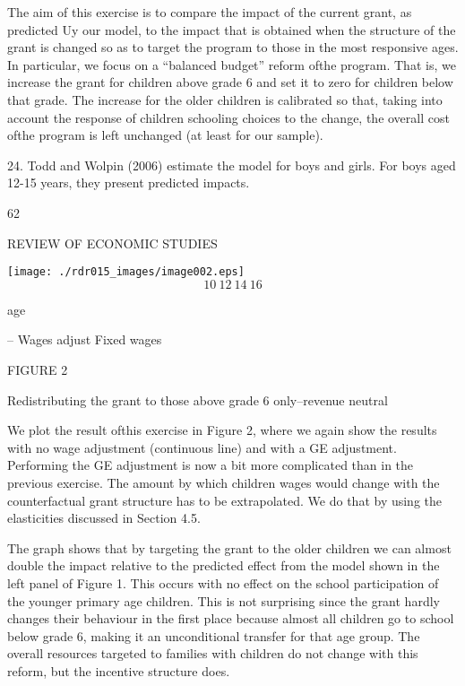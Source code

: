 The aim of this exercise is to compare the impact of the current grant, as predicted Uy our model, to the impact that is obtained when the structure of the grant is changed so as to target the program to those in the most responsive ages. In particular, we focus on a ``balanced budget'' reform ofthe program. That is, we increase the grant for children above grade 6 and set it to zero for children below that grade. The increase for the older children is calibrated so that, taking into account the response of children schooling choices to the change, the overall cost ofthe program is left unchanged (at least for our sample).

24. Todd and Wolpin (2006) estimate the model for boys and girls. For boys aged 12-15 years, they present predicted impacts.

62

REVIEW OF ECONOMIC STUDIES
\begin{center}
\texttt{[image: ./rdr015\_images/image002.eps]}
$$
10\ 12\ 14\ 16
$$
\end{center}
age

-- Wages adjust Fixed wages

FIGURE 2

Redistributing the grant to those above grade 6 only--revenue neutral

We plot the result ofthis exercise in Figure 2, where we again show the results with no wage adjustment (continuous line) and with a GE adjustment. Performing the GE adjustment is now a bit more complicated than in the previous exercise. The amount by which children wages would change with the counterfactual grant structure has to be extrapolated. We do that by using the elasticities discussed in Section 4.5.

The graph shows that by targeting the grant to the older children we can almost double the impact relative to the predicted effect from the model shown in the left panel of Figure 1. This occurs with no effect on the school participation of the younger primary age children. This is not surprising since the grant hardly changes their behaviour in the first place because almost all children go to school below grade 6, making it an unconditional transfer for that age group. The overall resources targeted to families with children do not change with this reform, but the incentive structure does.


